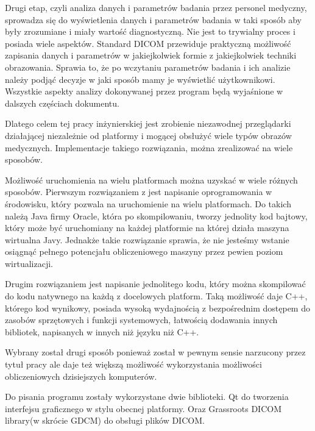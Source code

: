 Drugi etap, czyli analiza danych i parametrów badania przez personel medyczny, sprowadza się do wyświetlenia danych i parametrów badania w taki sposób aby były zrozumiane i miały wartość diagnostyczną.
Nie jest to trywialny proces i posiada wiele aspektów.
Standard DICOM przewiduje praktyczną możliwość zapisania danych i parametrów w jakiejkolwiek formie z jakiejkolwiek techniki obrazowania.
Sprawia to, że po wczytaniu parametrów badania i ich analizie należy podjąć decyzje w jaki sposób mamy je wyświetlić użytkownikowi.
Wszystkie aspekty analizy dokonywanej przez program będą wyjaśnione w dalszych częściach dokumentu.


Dlatego celem tej pracy inżynierskiej jest zrobienie niezawodnej przeglądarki działającej niezależnie od platformy i mogącej obsłużyć wiele typów obrazów medycznych.
Implementacje takiego rozwiązania, można zrealizować na wiele sposobów.

Możliwość uruchomienia na wielu platformach można uzyskać w wiele różnych sposobów.
Pierwszym rozwiązaniem z jest napisanie oprogramowania w środowisku, który pozwala na uruchomienie na wielu platformach.
Do takich należą Java firmy Oracle, która po skompilowaniu, tworzy jednolity kod bajtowy, który może być uruchomiany na każdej platformie na której działa maszyna wirtualna Javy.
Jednakże takie rozwiązanie sprawia, że nie jesteśmy wstanie osiągnąć pełnego potencjału obliczeniowego maszyny przez pewien poziom wirtualizacji.

Drugim rozwiązaniem jest napisanie jednolitego kodu, który można skompilować do kodu natywnego na każdą z docelowych platform.
Taką możliwość daje C++, którego kod wynikowy, posiada wysoką wydajnością z bezpośrednim dostępem do zasobów sprzętowych i funkcji systemowych, łatwością dodawania innych bibliotek, napisanych w innych niż języku niż C++.

Wybrany został drugi sposób ponieważ został w pewnym sensie narzucony przez tytuł pracy ale daje też większą możliwość wykorzystania możliwości obliczeniowych dzisiejszych komputerów.

Do pisania programu zostały wykorzystane dwie biblioteki. Qt do tworzenia interfejsu graficznego w stylu obecnej platformy. Oraz Grassroots DICOM library(w skrócie GDCM) do obsługi plików DICOM.

